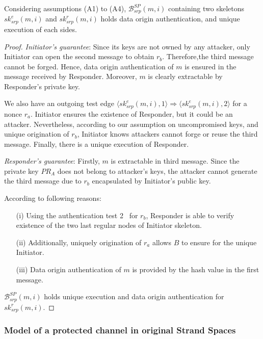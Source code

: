 \begin{Proposition}
Considering assumptions (A1) to (A4), $\mathcal{B}^{SP}_{srp}(m,i)$ containing two skeletons $sk^e_{srp}(m,i)$ and $sk^r_{srp}(m,i)$ holds data origin authentication, and unique execution of each sides. 
\end{Proposition}

\begin{proof}

\emph{Initiator's guarantee}: Since its keys are not owned by any attacker, only Initiator can open the second message to obtain $r_b$. Therefore,the third message cannot be forged. Hence, data origin authentication of $m$ is ensured in the message received by Responder. Moreover, $m$ is clearly extractable by Responder's private key. 

We also have an outgoing test edge $\langle sk^e_{srp}(m,i),1 \rangle \Rightarrow \langle sk^e_{srp}(m,i),2 \rangle$ for a nonce $r_a$. Initiator ensures the existence of Responder, but it could be an attacker. Nevertheless, according to our assumption on uncompromised keys, and unique origination of $r_b$, Initiator knows attackers cannot forge or reuse the third message. Finally, there is a unique execution of Responder.

\emph{Responder's guarantee}: Firstly, $m$ is extractable in third message. Since the private key $PR_A$ does not belong to attacker’s keys, the attacker cannot generate the third message due to $r_b$ encapsulated by Initiator's public key.  

According to following reasons: 
\begin{enumerate}
\item[(i)] Using the authentication test 2~\cite{Guttman:2002:ATS:568264.568267} for $r_b$, Responder is able to verify existence of the two last regular nodes of Initiator skeleton.
\item[(ii)] Additionally, uniquely origination of $r_a$ allows $B$ to ensure for the unique Initiator.
\item [(iii)] Data origin authentication of $m$ is provided by the hash value in the first message. 
\end{enumerate}

$\mathcal{B}^{SP}_{srp}(m,i)$ holds unique execution and data origin authentication for $sk^r_{srp}(m,i)$.
 \end{proof}

\subsubsection*{Model of a protected channel in original Strand Spaces}\label{protect}

